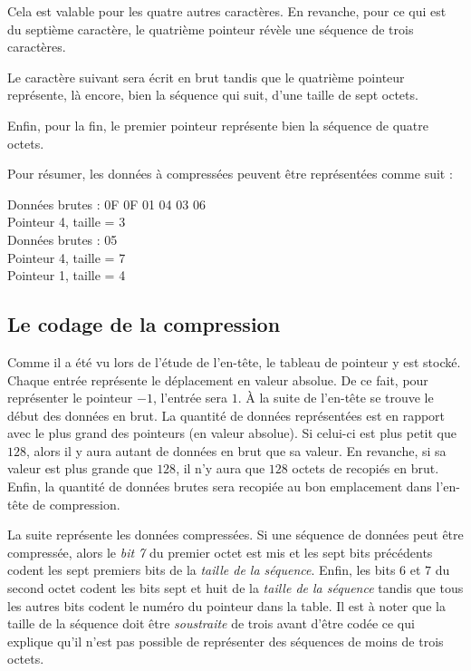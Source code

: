 Cela est valable pour les quatre autres caractères. En revanche, pour ce qui
est du septième caractère, le quatrième pointeur révèle une séquence de trois
caractères.

Le caractère suivant sera écrit en brut tandis que le quatrième
pointeur représente, là encore, bien la séquence qui suit, d'une taille de
sept octets.

Enfin, pour la fin, le premier pointeur représente bien la séquence de quatre
octets.
\medskip

Pour résumer, les données à compressées peuvent être représentées comme suit :

\begin{exemple}
Données brutes : 0F 0F 01 04 03 06 \\
Pointeur 4, taille = 3 \\
Données brutes : 05 \\
Pointeur 4, taille = 7 \\
Pointeur 1, taille = 4
\end{exemple}


\subsection{Le codage de la compression}
Comme il a été vu lors de l'étude de l'en-tête, le tableau de pointeur y est
stocké. Chaque entrée représente le déplacement en valeur absolue. De ce fait,
pour représenter le pointeur $-1$, l'entrée sera $1$. À la suite de l'en-tête
se trouve le début des données en brut. La quantité de données représentées
est en rapport avec le plus grand des pointeurs (en valeur absolue). Si
celui-ci est plus petit que $128$, alors il y aura autant de données en brut
que sa valeur. En revanche, si sa valeur est plus grande que $128$, il n'y aura
que $128$ octets de recopiés en brut. Enfin, la quantité de données brutes
sera recopiée au bon emplacement dans l'en-tête de compression.

La suite représente les données compressées. Si une séquence de données
peut être compressée, alors le \emph{bit 7} du premier octet est mis et
les sept bits précédents codent les sept premiers bits de la \emph{taille de
la séquence}. Enfin, les bits $6$ et $7$ du second octet codent les bits
sept et huit de la \emph{taille de la séquence} tandis que tous les autres
bits codent le numéro du pointeur dans la table. Il est à noter que la taille
de la séquence doit être \emph{soustraite} de trois avant d'être codée ce qui
explique qu'il n'est pas possible de représenter des séquences de moins de
trois octets.

